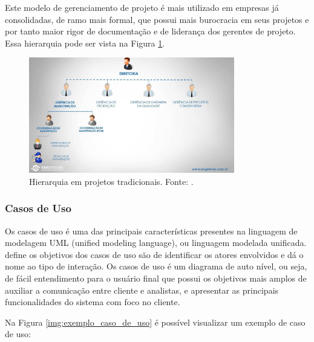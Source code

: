 Este modelo de gerenciamento de projeto é mais utilizado em empresas já consolidadas, de ramo mais formal, que possui mais burocracia em seus projetos e por tanto maior rigor de documentação e de liderança dos gerentes de projeto. Essa hierarquia pode ser vista na Figura \ref{img:gerencia_de_projetos_tradicional}.

\begin{figure}[H]
	\centering
	\includegraphics[width=0.8\textwidth]{figuras/gerencia_de_projeto.jpg}
	\caption{Hierarquia em projetos tradicionais. Fonte: \cite{gerentes_tradicionais}.}
	\label{img:gerencia_de_projetos_tradicional}
\end{figure}

\subsubsection{Casos de Uso}
\label{sec:casos_de_uso}

Os casos de uso é uma das principais características presentes na linguagem de modelagem UML (unified modeling language), ou linguagem modelada unificada. \cite{sommerville} define os objetivos dos casos de uso são de identificar os atores envolvidos e dá o nome ao tipo de interação. Os casos de uso é um diagrama de auto nível, ou seja, de fácil entendimento para o usuário final que possui os objetivos mais amplos de auxiliar a comunicação entre cliente e analistas, e apresentar as principais funcionalidades do sistema com foco no cliente.

Na Figura \ref{img:exemplo_caso_de_uso} é possível visualizar um exemplo de caso de uso:

